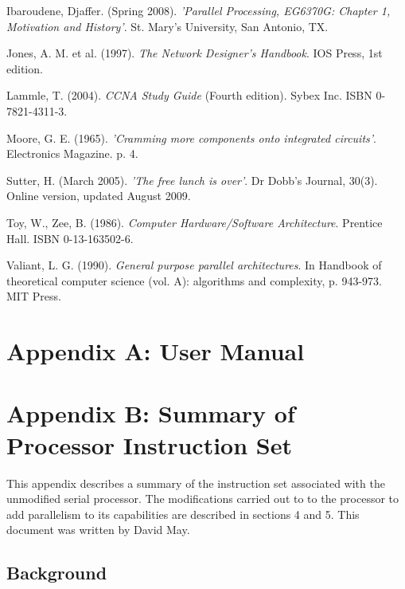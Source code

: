 \documentclass[a4paper, 12pt]{article}
\begin{document}
\begin{thebibliography}{30}
 Ibaroudene, Djaffer. (Spring 2008). \textit{'Parallel Processing, EG6370G: Chapter 1, Motivation and History'}. St. Mary's University, San Antonio, TX.

 Jones, A. M. et al. (1997). \textit{The Network Designer's Handbook}. IOS Press, 1st edition.

 Lammle, T. (2004). \textit{CCNA Study Guide} (Fourth edition). Sybex Inc. ISBN 0-7821-4311-3.

 Moore, G. E. (1965). \textit{'Cramming more components onto integrated circuits'}. Electronics Magazine. p. 4.

 Sutter, H. (March 2005). \textit{'The free lunch is over'}. Dr Dobb's Journal, 30(3). Online version, updated August 2009.

 Toy, W., Zee, B. (1986). \textit{Computer Hardware/Software Architecture}. Prentice Hall. ISBN 0-13-163502-6.

 Valiant, L. G. (1990). \textit{General purpose parallel architectures}. In Handbook of theoretical computer science (vol. A): algorithms and complexity, p. 943-973. MIT Press.

\end{thebibliography}

\newpage
\section*{Appendix A: User Manual}


\newpage
\section*{Appendix B: Summary of Processor Instruction Set}

This appendix describes a summary of the instruction set associated with the unmodified serial processor. The modifications carried out to to the processor to add parallelism to its capabilities are described in sections 4 and 5. This document was written by David May.

\subsection*{Background}
\setlength{\parindent}{0in}
\end{document}
